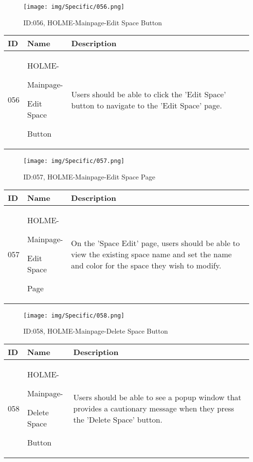 \documentclass[conference]{IEEEtran}
\begin{document}
\begin{enumerate}
\begin{figure}[h]
\centering
\texttt{[image: img/Specific/056.png]}
\caption{ID:056, HOLME-Mainpage-Edit Space Button}
\end{figure}
\begin{table}[h]
\def\arraystretch{1.2} \small
    \begin{tabular}{|p{1cm}|p{1.8cm}|p{5.0cm}|}
        \hline
        ID & Name & Description\\ \hline
         056 \par  & HOLME-\par Mainpage-\par Edit Space\par Button &Users should be able to click the 'Edit Space' button to navigate to the 'Edit Space' page.\\ \hline
    \end{tabular}
\end{table}

\begin{figure}[h]
\centering
\texttt{[image: img/Specific/057.png]}
\caption{ID:057, HOLME-Mainpage-Edit Space Page}
\end{figure}
\begin{table}[h]
\def\arraystretch{1.2} \small
    \begin{tabular}{|p{1cm}|p{1.8cm}|p{5.0cm}|}
        \hline
        ID & Name & Description\\ \hline
         057 \par  & HOLME-\par Mainpage-\par Edit Space\par Page  &On the 'Space Edit' page, users should be able to view the existing space name and set the name and color for the space they wish to modify.\\ \hline
    \end{tabular}
\end{table}

\clearpage

\begin{figure}[h]
\centering
\texttt{[image: img/Specific/058.png]}
\caption{ID:058, HOLME-Mainpage-Delete Space Button}
\end{figure}
\begin{table}[h]
\def\arraystretch{1.2} \small
    \begin{tabular}{|p{1cm}|p{1.8cm}|p{5.0cm}|}
        \hline
        ID & Name & Description\\ \hline
         058 \par  & HOLME-\par Mainpage-\par Delete Space\par Button &Users should be able to see a popup window that provides a cautionary message when they press the 'Delete Space' button.\\ \hline
    \end{tabular}
\end{table}


\end{enumerate}
\end{document}
